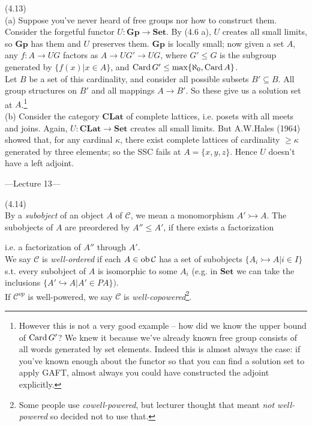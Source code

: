 \documentclass[a4paper]{article}
\begin{document}
\begin{eg} (4.13)\\
    (a) Suppose you've never heard of free groups nor how to construct them. Consider the forgetful functor $U: \mathbf{Gp} \to \mathbf{Set}$. By (4.6 a), $U$ creates all small limits, so $\mathbf{Gp}$ has them and $U$ preserves them. $\mathbf{Gp}$ is locally small; now given a set $A$, any $f:A \to UG$ factors as $A \to UG' \to UG$, where $G' \leq G$ is the subgroup generated by $\{f(x) |x \in A\}$, and $\operatorname{Card} G' \leq \max\{\aleph_0,\operatorname{Card} A\}$.\\
    Let $B$ be a set of this cardinality, and consider all possible subsets $B' \subseteq B$. All group structures on $B'$ and all mappings $A \to B'$. So these give us a solution set at $A$.\footnote{However this is not a very good example -- how did we know the upper bound of $\operatorname{Card} G'$? We knew it because we've already known free group consists of all words generated by set elements. Indeed this is almost always the case: if you've known enough about the functor so that you can find a solution set to apply GAFT, almost always you could have constructed the adjoint explicitly.}\\
    (b) Consider the category $\mathbf{CLat}$ of complete lattices, i.e. posets with all meets and joins. Again, $U:\mathbf{CLat} \to \mathbf{Set}$ creates all small limits. But A.W.Hales (1964) showed that, for any cardinal $\kappa$, there exist complete lattices of cardinality $\geq \kappa$ generated by three elements; so the SSC fails at $A=\{x,y,z\}$. Hence $U$ doesn't have a left adjoint.
\end{eg}

---Lecture 13---

\begin{defi} (4.14)\\
    By a \emph{subobject} of an object $A$ of $\mathcal{C}$, we mean a monomorphism $A' \rightarrowtail A$. The subobjects of $A$ are preordered by $A'' \leq A'$, if there exists a factorization 
    i.e. a factorization of $A''$ through $A'$.\\
    We say $\mathcal{C}$ is \emph{well-ordered} if each $A \in \operatorname{ob}\mathcal{C}$ has a set of subobjects $\{A_i \rightarrowtail A | i \in I\}$ s.t. every subobject of $A$ is isomorphic to some $A_i$ (e.g. in $\mathbf{Set}$ we can take the inclusions $\{A' \hookrightarrow A| A'\in PA\})$.\\
    If $\mathcal{C}^{op}$ is well-powered, we say $\mathcal{C}$ is \emph{well-copowered}\footnote{Some people use \emph{cowell-powered}, but lecturer thought that meant \emph{not well-powered} so decided not to use that.}. 
\end{defi}
\end{document}
